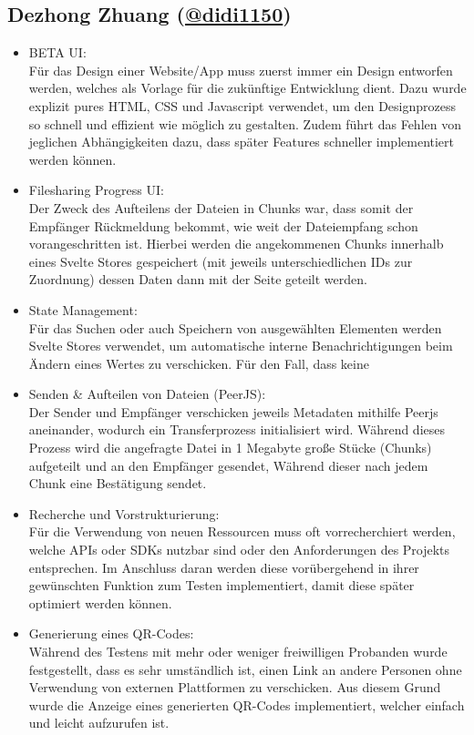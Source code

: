 \documentclass[a4paper]{article}
\begin{document}
\subsection{Dezhong Zhuang (\href{https://github.com/didi1150}{@didi1150})}
\begin{itemize}
      \item BETA UI:\\
            Für das Design einer Website/App muss zuerst immer ein Design
            entworfen werden, welches als Vorlage für die zukünftige Entwicklung
            dient. Dazu wurde explizit pures HTML, CSS und Javascript verwendet,
            um den Designprozess so schnell und effizient wie möglich zu
            gestalten. Zudem führt das Fehlen von jeglichen Abhängigkeiten dazu,
            dass später Features schneller implementiert werden können.
      \item Filesharing Progress UI:\\
            Der Zweck des Aufteilens der Dateien in Chunks war, dass somit der
            Empfänger Rückmeldung bekommt, wie weit der Dateiempfang schon
            vorangeschritten ist. Hierbei werden die angekommenen Chunks
            innerhalb eines Svelte Stores gespeichert (mit jeweils
            unterschiedlichen IDs zur Zuordnung) dessen Daten dann mit der Seite
            geteilt werden.
      \item State Management:\\
            Für das Suchen oder auch Speichern von ausgewählten Elementen werden
            Svelte Stores verwendet, um automatische interne Benachrichtigungen
            beim Ändern eines Wertes zu verschicken. Für den Fall, dass keine
      \item Senden \& Aufteilen von Dateien (PeerJS):\\
            Der Sender und Empfänger verschicken jeweils Metadaten
            mithilfe Peerjs aneinander, wodurch ein Transferprozess
            initialisiert wird. Während dieses Prozess wird die angefragte Datei
            in 1 Megabyte große Stücke (Chunks) aufgeteilt und an den Empfänger
            gesendet, Während dieser nach jedem Chunk eine Bestätigung sendet.
      \item Recherche und Vorstrukturierung:\\
            Für die Verwendung von neuen Ressourcen muss oft vorrecherchiert
            werden, welche APIs oder SDKs nutzbar sind oder den Anforderungen
            des Projekts entsprechen. Im Anschluss daran werden diese
            vorübergehend in ihrer gewünschten Funktion zum Testen
            implementiert, damit diese später optimiert werden können.
      \item Generierung eines QR-Codes:\\
            Während des Testens mit mehr oder weniger freiwilligen Probanden
            wurde festgestellt, dass es sehr umständlich ist, einen Link an
            andere Personen ohne Verwendung von externen Plattformen zu
            verschicken. Aus diesem Grund wurde die Anzeige eines generierten
            QR-Codes implementiert, welcher einfach und leicht aufzurufen ist.
\end{itemize}
\end{document}
